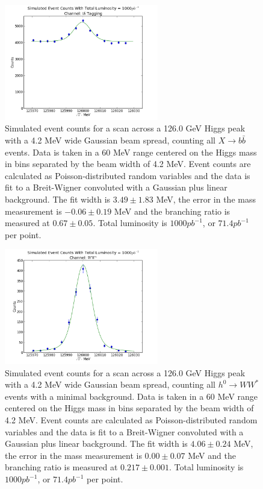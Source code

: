 \documentclass[a4paper]{article}
\begin{document}
\begin{figure}[H]
	\includegraphics[width=0.6\textwidth]{data-fit-bbbar-raw}
	\caption{Simulated event counts for a scan across a 126.0 GeV Higgs peak with a 4.2 MeV wide Gaussian beam spread, counting all $X\rightarrow b\bar{b}$ events. Data is taken in a 60 MeV range centered on the Higgs mass in bins separated by the beam width of 4.2 MeV. Event counts are calculated as Poisson-distributed random variables and the data is fit to a Breit-Wigner convoluted with a Gaussian plus linear background. The fit width is $3.49\pm1.83$ MeV, the error in the mass measurement is $-0.06\pm0.19$ MeV and the branching ratio is measured at $0.67\pm0.05$. Total luminosity is $1000pb^{-1}$, or $71.4pb^{-1}$ per point.}
\label{data-fit-bbbar-raw}
\end{figure}

\begin{figure}[H]
	\includegraphics[width=0.6\textwidth]{data-fit-ww-raw}
	\caption{Simulated event counts for a scan across a 126.0 GeV Higgs peak with a 4.2 MeV wide Gaussian beam spread, counting all $h^0\rightarrow WW^*$ events with a minimal background. Data is taken in a 60 MeV range centered on the Higgs mass in bins separated by the beam width of 4.2 MeV. Event counts are calculated as Poisson-distributed random variables and the data is fit to a Breit-Wigner convoluted with a Gaussian plus linear background. The fit width is $4.06\pm0.24$ MeV, the error in the mass measurement is $0.00\pm0.07$ MeV and the branching ratio is measured at $0.217\pm0.001$. Total luminosity is $1000pb^{-1}$, or $71.4pb^{-1}$ per point.}
\label{data-fit-ww-raw}
\end{figure}
\end{document}
